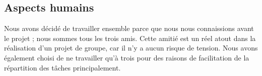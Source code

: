 \subsection{Aspects humains} \indent Nous avons décidé de travailler ensemble parce que nous nous connaissions avant le projet ; nous sommes tous les trois amis. Cette amitié est un réel atout dans la réalisation d'un projet de groupe, car il n'y a aucun risque de tension. Nous avons également choisi de ne travailler qu'à trois pour des raisons de facilitation de la répartition des tâches principalement.
